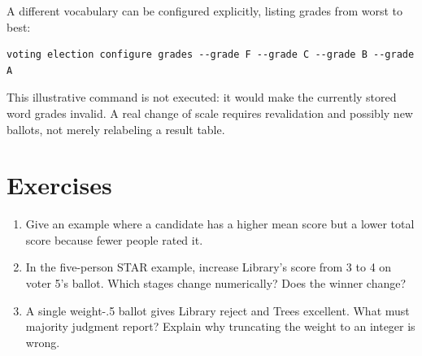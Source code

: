 A different vocabulary can be configured explicitly, listing grades from worst to best:
\begin{lstlisting}
voting election configure grades --grade F --grade C --grade B --grade A
\end{lstlisting}
This illustrative command is not executed: it would make the currently stored word grades invalid. A real change of scale requires revalidation and possibly new ballots, not merely relabeling a result table.

\section{Exercises}
\begin{enumerate}
\item Give an example where a candidate has a higher mean score but a lower total score because fewer people rated it.
\item In the five-person STAR example, increase Library's score from 3 to 4 on voter 5's ballot. Which stages change numerically? Does the winner change?
\item A single weight-.5 ballot gives Library reject and Trees excellent. What must majority judgment report? Explain why truncating the weight to an integer is wrong.
\end{enumerate}
